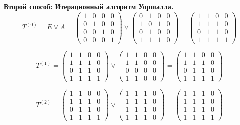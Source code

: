 \documentclass[14pt]{extarticle}
\begin{document}
\textbf{Второй способ: Итерационный алгоритм Уоршалла.}
\[
T^{(0)} = E \lor A = \begin{pmatrix}
1 & 0 & 0 & 0 \\
0 & 1 & 0 & 0 \\
0 & 0 & 1 & 0 \\
0 & 0 & 0 & 1
\end{pmatrix}
\lor
\begin{pmatrix}
0 & 1 & 0 & 0 \\
1 & 0 & 1 & 0 \\
0 & 1 & 0 & 0 \\
1 & 1 & 1 & 0
\end{pmatrix}
=
\begin{pmatrix}
1 & 1 & 0 & 0 \\
1 & 1 & 1 & 0 \\
0 & 1 & 1 & 0 \\
1 & 1 & 1 & 1
\end{pmatrix}
\]

\[
T^{(1)} = \begin{pmatrix}
1 & 1 & 0 & 0 \\
1 & 1 & 1 & 0\\
0 & 1 & 1 & 0\\
1 & 1 & 1 & 1
\end{pmatrix}
\lor
\begin{pmatrix}
1 & 1 & 0 & 0 \\
1 & 1 & 0 & 0 \\
0 & 0 & 0 & 0 \\
1 & 1 & 0 & 0
\end{pmatrix}
= 
\begin{pmatrix}
1 & 1 & 0 & 0 \\
1 & 1 & 1 & 0 \\
0 & 1 & 1 & 0 \\
1 & 1 & 1 & 1
\end{pmatrix}
\]

\[
T^{(2)} = \begin{pmatrix}
1 & 1 & 0 & 0 \\
1 & 1 & 1 & 0 \\
0 & 1 & 1 & 0 \\
1 & 1 & 1 & 1
\end{pmatrix}
\lor
\begin{pmatrix}
1 & 1 & 1 & 0 \\
1 & 1 & 1 & 0 \\
1 & 1 & 1 & 0 \\
1 & 1 & 1 & 0
\end{pmatrix}
=
\begin{pmatrix}
1 & 1 & 1 & 0 \\
1 & 1 & 1 & 0 \\
1 & 1 & 1 & 0 \\
1 & 1 & 1 & 1
\end{pmatrix}
\]
\end{document}
